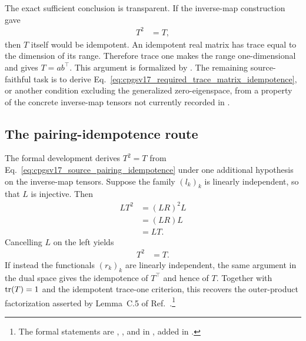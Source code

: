 \documentclass{article}
\begin{document}
The exact sufficient conclusion is transparent. If the inverse-map
construction gave
\begin{align}
    T^2
        &= T,
    \label{eq:cpgsv17_required_trace_matrix_idempotence}
\end{align}
then $T$ itself would be idempotent. An idempotent real matrix has trace equal
to the dimension of its range. Therefore trace one makes the range
one-dimensional and gives $T=ab^{\top}$. This argument is formalized by
. The remaining
source-faithful task is to derive
Eq.~\ref{eq:cpgsv17_required_trace_matrix_idempotence}, or another condition
excluding the generalized zero-eigenspace, from a property of the concrete
inverse-map tensors not currently recorded in
.

\subsection{The pairing-idempotence route}
\label{sec:cpgsv17_pairing_idempotence_route}

The formal development derives $T^2=T$ from
Eq.~\ref{eq:cpgsv17_source_pairing_idempotence} under one additional
hypothesis on the inverse-map tensors. Suppose the family $(l_k)_k$ is linearly
independent, so that $L$ is injective. Then
\begin{align}
    LT^2
        &= (LR)^2L
    \label{eq:cpgsv17_injective_pairing_first_step}\\
        &= (LR)L
    \label{eq:cpgsv17_injective_pairing_second_step}\\
        &= LT.
    \label{eq:cpgsv17_injective_pairing_cancellation_input}
\end{align}
Cancelling $L$ on the left yields
\begin{align}
    T^2
        &= T.
    \label{eq:cpgsv17_injective_pairing_idempotence}
\end{align}
If instead the functionals $(r_k)_k$ are linearly independent, the same
argument in the dual space gives the idempotence of $T^{\top}$ and hence of
$T$. Together with $\operatorname{tr}(T)=1$ and the idempotent trace-one criterion, this
recovers the outer-product factorization asserted by Lemma~C.5 of
Ref.~\cite{Cirac2016MPDO_arXiv}.\footnote{\sloppy The formal statements are
{\scriptsize{}},
{\scriptsize{}}, and
{\scriptsize{}} in
, added in .}
\end{document}

